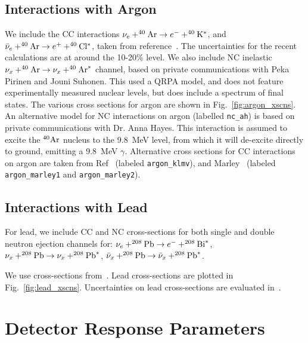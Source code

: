 \documentclass[12pt]{article}
\begin{document}
\subsection{Interactions with Argon}

We include the CC interactions
$\nu_e + ^{40}{\rm Ar} \rightarrow e^- + ^{40}{\rm K^*}$, and
$\bar{\nu}_e + ^{40}{\rm Ar} \rightarrow e^+ + ^{40}{\rm Cl^*}$, taken 
from reference~\cite{1475-7516-2003-10-009}.
   The uncertainties for the recent calculations
are at around the 10-20\% level.
We also include NC inelastic
$\nu_x + ^{40}{\rm Ar} \rightarrow \nu_x+ ^{40}{\rm Ar}^*$ channel, based on private communications with
Peka Pirinen and Jouni Suhonen.  This used a QRPA model, and does not feature 
experimentally measured nuclear levels, but does include a spectrum of final states.
The various cross sections for argon are shown in Fig.~\ref{fig:argon_xscns}.
An alternative model for NC interactions on argon (labelled \texttt{nc\_ah}) is based on private
communications with Dr. Anna Hayes.  This interaction is assumed to excite the $^{40}{\rm Ar}$
nucleus to the 9.8~MeV level, from which it will de-excite directly to ground, emitting a 9.8~MeV $\gamma$.
Alternative cross sections for CC interactions on argon are taken from Ref~\cite{Kolbe:2003ys}
(labeled \texttt{argon\_klmv}), and Marley~\cite{marley_webpage} (labeled \texttt{argon\_marley1}
and \texttt{argon\_marley2}).


\subsection{Interactions with Lead}

For lead, we include
CC and NC cross-sections for both single and double
neutron ejection channels for:
$\nu_e + ^{208}{\rm Pb} \rightarrow e^- + ^{208}{\rm Bi}^{*}$,
$\nu_x + ^{208}{\rm Pb} \rightarrow \nu_x + ^{208}{\rm Pb}^{*}$,
$\bar{\nu}_x + ^{208}{\rm Pb} \rightarrow \bar{\nu}_x + ^{208}{\rm Pb}^{*}$.

We use cross-sections from~\cite{Engel:2002hg}.
Lead cross-sections are plotted in Fig.~\ref{fig:lead_xscns}.  Uncertainties on lead cross-sections are evaluated in~\cite{Paar:2011pz}.

\section{Detector Response Parameters}\label{response}
\end{document}
